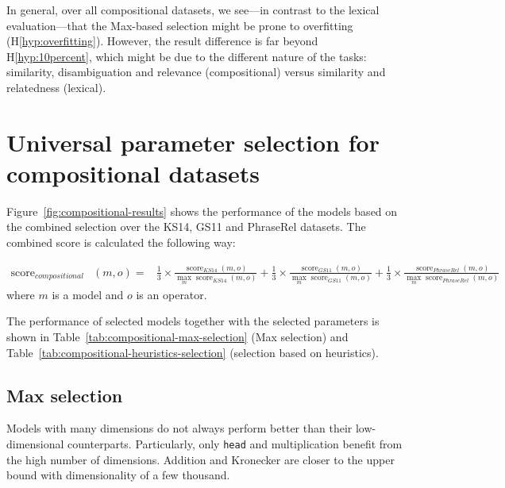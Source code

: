 In general, over all compositional datasets, we see---in contrast to the lexical evaluation---that the Max-based selection might be prone to overfitting (H\ref{hyp:overfitting}). However, the result difference is far beyond H\ref{hyp:10percent}, which might be due to the different nature of the tasks: similarity, disambiguation and relevance (compositional) versus similarity and relatedness (lexical).
%
%

\section{Universal parameter selection for compositional datasets}
\label{sec:robust-param-comp-selecion}

Figure~\ref{fig:compositional-results} shows the performance of the models based on the combined selection over the KS14, GS11 and PhraseRel datasets. The combined score is calculated the following way:

{
\scriptsize
\begin{align}
\operatorname{score}_\mathit{compositional}&(\mathit{m}, \mathit{o}) =
&\frac{1}{3}\times%
\frac{\operatorname{score}_\mathit{KS14}(\mathit{m}, \mathit{o})}%
{\max_m\operatorname{score}_\mathit{KS14}(m, \mathit{o})}%
+%
\frac{1}{3}\times%
\frac{\operatorname{score}_\mathit{GS11}(\mathit{m}, \mathit{o})}%
{\max_m\operatorname{score}_\mathit{GS11}(m, \mathit{o})}%
+%
\frac{1}{3}\times%
\frac{\operatorname{score}_\mathit{PhraseRel}(\mathit{m, \mathit{o}})}%
{\max_m\operatorname{score}_\mathit{PhraseRel}(m, \mathit{o})}%
\end{align}
}
where $m$ is a model and $o$ is an operator.

The performance of selected models together with the selected parameters is shown in Table~\ref{tab:compositional-max-selection} (Max selection) and Table~\ref{tab:compositional-heuristics-selection} (selection based on heuristics).



\subsection{Max selection}
\label{sec:max-selection-compositional}

Models with many dimensions do not always perform better than their low-dimensional counterparts. Particularly, only \texttt{head} and multiplication benefit from the high number of dimensions. Addition and Kronecker are closer to the upper bound with dimensionality of a few thousand.

